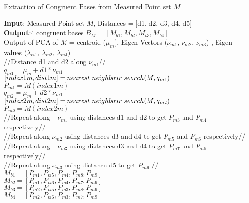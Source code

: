 \documentclass[12pt]{article}
\begin{document}
\begin{algorithm}[H]
\caption{Extraction of Congruent Bases from Measured Point set $M$}
\textbf{Input}: Measured Point set $M$, Distances = [d1, d2, d3, d4, d5]\\
\textbf{Output}:4 congruent bases $B_M = [M_{b1},M_{b2},M_{b3},M_{b4}]$\\
\vspace{0.25cm}
Output of PCA of $M$ = centroid ($\mu_m$), Eigen Vectors ($\nu_{m1}$, $\nu_{m2}$, $\nu_{m3}$) , Eigen values ($\lambda_{m1}$, $\lambda_{m2}$, $\lambda_{m3}$)\\
\vspace{0.25cm}
//Distance d1 and d2 along $\nu_{m1}$// \\
\vspace{0.25cm}
$q_{m1}= \mu_m + d1*\nu_{m1}$ \\
$[index1m,dist1m] = nearest\hspace{0.1cm} neighbour \hspace{0.1cm}search(M,q_{m1})$\\
$P_{m1} = M(index1m)$\\
\vspace{0.25cm}
$q_{m2}= \mu_m + d2*\nu_{m1}$ \\
$[index2m,dist2m] = nearest\hspace{0.1cm} neighbour\hspace{0.1cm} search(M,q_{m2})$\\
$P_{m2} = M(index2m)$\\
\vspace{0.25cm}
//Repeat along $-\nu_{m1}$ using distances d1 and d2 to get $P_{m3}$ and $P_{m4}$ respectively// \\
\vspace{0.25cm}
//Repeat along $\nu_{m2}$ using distances d3 and d4 to get $P_{m5}$ and $P_{m6}$ respectively//\\
\vspace{0.25cm}
//Repeat along $-\nu_{m2}$ using distances d3 and d4 to get $P_{m7}$ and $P_{m8}$ respectively// \\
\vspace{0.25cm}
//Repeat along $\nu_{m3}$ using distance d5 to get $P_{m9}$ // \\
\vspace{0.25cm}
$M_{b1}=[P_{m1},P_{m5},P_{m4},P_{m8},P_{m9}]$\\
$M_{b2}=[P_{m1},P_{m6},P_{m4},P_{m7},P_{m9}]$\\
$M_{b3}=[P_{m2},P_{m5},P_{m3},P_{m8},P_{m9}]$\\
$M_{b4}=[P_{m2},P_{m6},P_{m3},P_{m7},P_{m9}]$\\







\end{algorithm}
\end{document}
